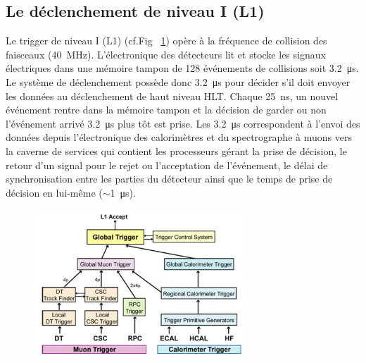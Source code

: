 \subsection{Le déclenchement de niveau I (L1)}
Le trigger de niveau I (L1) (cf.Fig~ \ref{L1}) opère à la fréquence de collision des faisceaux (\SI{40}{\mega\hertz}). L'électronique des détecteurs lit et stocke les  signaux électriques dans une mémoire tampon de \num{128} événements de collisions soit \SI{3.2}{\micro\second}. Le système de déclenchement possède donc \SI{3.2}{\micro\second} pour  décider s'il doit envoyer les données au déclenchement de haut niveau HLT. Chaque \SI{25}{\nano\second}, un nouvel événement rentre dans la mémoire tampon et la décision de garder ou non l'événement arrivé \SI{3.2}{\micro\second} plus tôt est prise. Les \SI{3.2}{\micro\second} correspondent à l'envoi des données depuis l'électronique des calorimètres et du spectrographe à muons vers la caverne de services qui contient les processeurs gérant la prise de décision, le retour d'un signal pour le rejet ou l'acceptation de l'événement, le délai de synchronisation entre les parties du détecteur ainsi que le temps de prise de décision en lui-même ($\sim$\SI{1}{\micro\second}). 

	  \begin{figure}[ht!]
	\centering
	\includegraphics[width=0.70\textwidth]{CMS/L1.png}
	\label{L1}
\end{figure}

